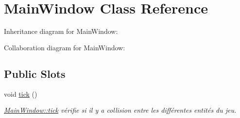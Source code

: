 \hypertarget{class_main_window}{}\section{Main\+Window Class Reference}
\label{class_main_window}


Inheritance diagram for Main\+Window\+:


Collaboration diagram for Main\+Window\+:
\subsection*{Public Slots}
\begin{DoxyCompactItemize}
\item 
\hypertarget{class_main_window_a48965b8c40edf53d61e2d41977c1566d}{}void \hyperlink{class_main_window_a48965b8c40edf53d61e2d41977c1566d}{tick} ()\label{class_main_window_a48965b8c40edf53d61e2d41977c1566d}

\begin{DoxyCompactList}\small\item\em \hyperlink{class_main_window_a48965b8c40edf53d61e2d41977c1566d}{Main\+Window\+::tick} vérifie si il y a collision entre les différentes entités du jeu. \end{DoxyCompactList}\end{DoxyCompactItemize}
